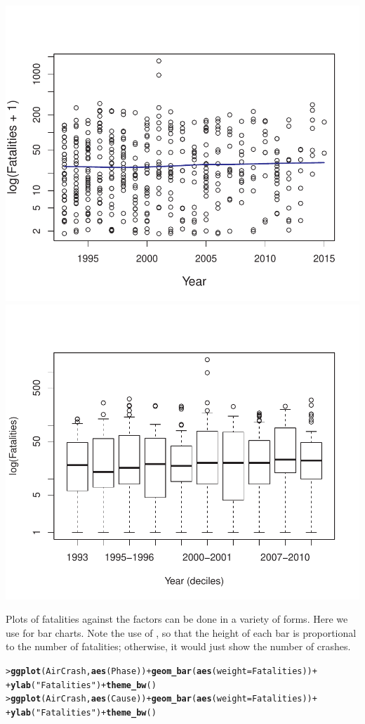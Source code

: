 \documentclass[10pt]{report}\usepackage[]{graphicx}\usepackage[]{color}
\makeatletter
\newcommand{\hlstr}[1]{\textcolor[rgb]{0.192,0.494,0.8}{#1}}%
\newcommand{\hlopt}[1]{\textcolor[rgb]{0,0,0}{#1}}%
\newcommand{\hlstd}[1]{\textcolor[rgb]{0.345,0.345,0.345}{#1}}%
\newcommand{\hlkwc}[1]{\textcolor[rgb]{0.333,0.667,0.333}{#1}}%
\newcommand{\hlkwd}[1]{\textcolor[rgb]{0.737,0.353,0.396}{\textbf{#1}}}%
\newenvironment{kframe}{%
 \def\at@end@of@kframe{}%
 \ifinner\ifhmode%
  \def\at@end@of@kframe{\end{minipage}}%
  \begin{minipage}{\columnwidth}%
 \fi\fi%
 \def\FrameCommand##1{\hskip\@totalleftmargin \hskip-\fboxsep
 \colorbox{shadecolor}{##1}\hskip-\fboxsep
     \hskip-\linewidth \hskip-\@totalleftmargin \hskip\columnwidth}%
 \MakeFramed {\advance\hsize-\width
   \@totalleftmargin\z@ \linewidth\hsize
   \@setminipage}}%
 {\par\unskip\endMakeFramed%
 \at@end@of@kframe}
\newenvironment{knitrout}{}{} %
\renewenvironment{knitrout}{\small\renewcommand{\baselinestretch}{.85}}{} %
\makeatother
\begin{document}
\begin{Exercises}
\begin{enumerate*}
\begin{ans}
\begin{knitrout}
\centerline{\includegraphics[width=.49\textwidth]{soln/fig/ex11_3a-1} 
\includegraphics[width=.49\textwidth]{soln/fig/ex11_3a-2} }



\end{knitrout}
    Plots of fatalities against the factors can be done in a variety of forms.  Here we use 
    for bar charts.  Note the use of , so that the height of each
    bar is proportional to the number of fatalities; otherwise, it would just show the number of crashes.
\begin{knitrout}\footnotesize
{}\color{fgcolor}\begin{kframe}
\begin{alltt}
\hlstd{> }\hlkwd{ggplot}\hlstd{(AirCrash,} \hlkwd{aes}\hlstd{(Phase))} \hlopt{+} \hlkwd{geom_bar}\hlstd{(}\hlkwd{aes}\hlstd{(}\hlkwc{weight}\hlstd{=Fatalities))} \hlopt{+}
\hlstd{+ }      \hlkwd{ylab}\hlstd{(}\hlstr{"Fatalities"}\hlstd{)} \hlopt{+} \hlkwd{theme_bw}\hlstd{()}
\hlstd{> }\hlkwd{ggplot}\hlstd{(AirCrash,} \hlkwd{aes}\hlstd{(Cause))} \hlopt{+} \hlkwd{geom_bar}\hlstd{(}\hlkwd{aes}\hlstd{(}\hlkwc{weight}\hlstd{=Fatalities))} \hlopt{+}
\hlstd{+ }      \hlkwd{ylab}\hlstd{(}\hlstr{"Fatalities"}\hlstd{)} \hlopt{+} \hlkwd{theme_bw}\hlstd{()}
\end{alltt}
\end{kframe}


\end{knitrout}
\end{ans}
\end{enumerate*}
\end{Exercises}
\end{document}
